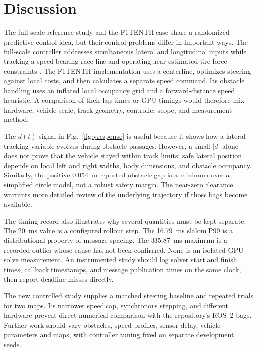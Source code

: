\documentclass{jamris}
\begin{document}
\section{Discussion}
The full-scale reference study and the F1TENTH case share a randomized predictive-control idea, but their control problems differ in important ways. The full-scale controller addresses simultaneous lateral and longitudinal inputs while tracking a speed-bearing race line and operating near estimated tire-force constraints \cite{muraleedharan2025racing}. The F1TENTH implementation uses a centerline, optimizes steering against local costs, and then calculates a separate speed command. Its obstacle handling uses an inflated local occupancy grid and a forward-distance speed heuristic. A comparison of their lap times or GPU timings would therefore mix hardware, vehicle scale, track geometry, controller scope, and measurement method.

The $d(t)$ signal in Fig.~\ref{fig:yresponse} is useful because it shows how a lateral tracking variable evolves during obstacle passages. However, a small $|d|$ alone does not prove that the vehicle stayed within track limits: safe lateral position depends on local left and right widths, body dimensions, and obstacle occupancy. Similarly, the positive 0.054~m reported obstacle gap is a minimum over a simplified circle model, not a robust safety margin. The near-zero clearance warrants more detailed review of the underlying trajectory if those bags become available.

The timing record also illustrates why several quantities must be kept separate. The 20~ms value is a configured rollout step. The 16.79~ms slalom P99 is a distributional property of message spacing. The 335.87~ms maximum is a recorded outlier whose cause has not been confirmed. None is an isolated GPU solve measurement. An instrumented study should log solver start and finish times, callback timestamps, and message publication times on the same clock, then report deadline misses directly.

The new controlled study supplies a matched steering baseline and repeated trials for two maps. Its narrower speed cap, synchronous stepping, and different hardware prevent direct numerical comparison with the repository's ROS~2 bags. Further work should vary obstacles, speed profiles, sensor delay, vehicle parameters and maps, with controller tuning fixed on separate development seeds.
\end{document}
